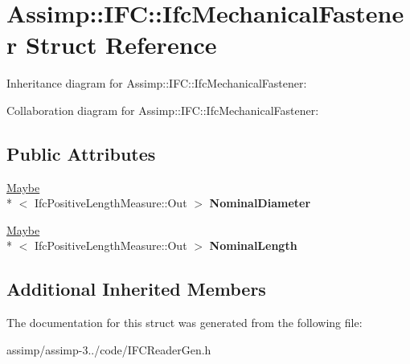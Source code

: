 \hypertarget{struct_assimp_1_1_i_f_c_1_1_ifc_mechanical_fastener}{\section{Assimp\+:\+:I\+F\+C\+:\+:Ifc\+Mechanical\+Fastener Struct Reference}
\label{struct_assimp_1_1_i_f_c_1_1_ifc_mechanical_fastener}
}


Inheritance diagram for Assimp\+:\+:I\+F\+C\+:\+:Ifc\+Mechanical\+Fastener\+:


Collaboration diagram for Assimp\+:\+:I\+F\+C\+:\+:Ifc\+Mechanical\+Fastener\+:
\subsection*{Public Attributes}
\begin{DoxyCompactItemize}
\item 
\hypertarget{struct_assimp_1_1_i_f_c_1_1_ifc_mechanical_fastener_a9864b2b10562b5c80c11ec8d839c3965}{\hyperlink{struct_assimp_1_1_s_t_e_p_1_1_maybe}{Maybe}\\*
$<$ Ifc\+Positive\+Length\+Measure\+::\+Out $>$ {\bfseries Nominal\+Diameter}}\label{struct_assimp_1_1_i_f_c_1_1_ifc_mechanical_fastener_a9864b2b10562b5c80c11ec8d839c3965}

\item 
\hypertarget{struct_assimp_1_1_i_f_c_1_1_ifc_mechanical_fastener_a4b8636e4e0e2285831255d9dc86ef706}{\hyperlink{struct_assimp_1_1_s_t_e_p_1_1_maybe}{Maybe}\\*
$<$ Ifc\+Positive\+Length\+Measure\+::\+Out $>$ {\bfseries Nominal\+Length}}\label{struct_assimp_1_1_i_f_c_1_1_ifc_mechanical_fastener_a4b8636e4e0e2285831255d9dc86ef706}

\end{DoxyCompactItemize}
\subsection*{Additional Inherited Members}


The documentation for this struct was generated from the following file\+:\begin{DoxyCompactItemize}
\item 
assimp/assimp-\/3../code/I\+F\+C\+Reader\+Gen.\+h\end{DoxyCompactItemize}
